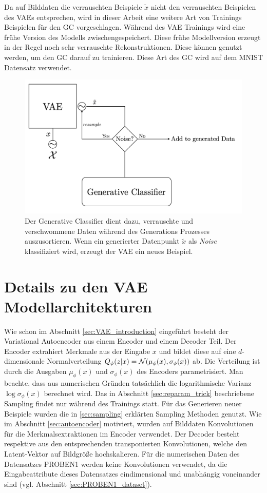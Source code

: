 Da auf Bilddaten die verrauschten Beispiele $\tilde{x}$ nicht den verrauschten Beispielen des VAEs entsprechen, wird in dieser Arbeit eine weitere Art von Trainings Beispielen für den GC vorgeschlagen. Während des VAE Trainings wird eine frühe Version des Modells zwischengespeichert. Diese frühe Modellversion erzeugt in der Regel noch sehr verrauschte Rekonstruktionen. Diese können genutzt werden, um den GC darauf zu trainieren. Diese Art des GC wird auf dem MNIST Datensatz verwendet.

\begin{figure}[hbt]
  \centering
  \includegraphics[width=.8\textwidth]{gfx/methodology/gc}
  \caption{Der Generative Classifier dient dazu, verrauschte und verschwommene Daten während des Generations Prozesses auszusortieren. Wenn ein generierter Datenpunkt $\tilde{x}$ als \textit{Noise} klassifiziert wird, erzeugt der VAE ein neues Beispiel.}
\end{figure}



\section{Details zu den VAE Modellarchitekturen}
Wie schon im Abschnitt \ref{sec:VAE_introduction} eingeführt besteht der Variational Autoencoder aus einem Encoder und einem Decoder Teil.
Der Encoder extrahiert Merkmale aus der Eingabe $x$ und bildet diese auf eine $d$-dimensionale Normalverteilung $Q_\phi(z \vert x) = \mathcal{N}(\mu_\phi(x), \sigma_\phi(x))$ ab. Die Verteilung ist durch die Ausgaben $\mu_\phi(x)$ und $\sigma_\phi(x)$ des Encoders parametrisiert. Man beachte, dass aus numerischen Gründen tatsächlich die logarithmische Varianz $\log \sigma_\phi(x)$ berechnet wird. Das in Abschnitt \ref{sec:reparam_trick} beschriebene Sampling findet nur während des Trainings statt. Für das Generieren neuer Beispiele wurden die in \ref{sec:sampling} erklärten Sampling Methoden genutzt. Wie im Abschnitt \ref{sec:autoencoder} motiviert, wurden auf Bilddaten Konvolutionen für die Merkmalsextraktionen im Encoder verwendet. Der Decoder besteht respektive aus den entsprechenden transponierten Konvolutionen, welche den Latent-Vektor auf Bildgröße hochskalieren. Für die numerischen Daten des Datensatzes PROBEN1 werden keine Konvolutionen verwendet, da die Eingabeattribute dieses Datensatzes eindimensional und unabhängig voneinander sind (vgl. Abschnitt \ref{sec:PROBEN1_dataset}).

